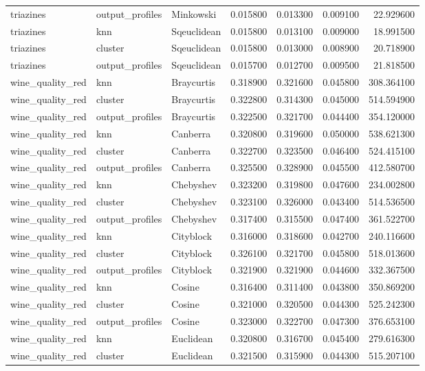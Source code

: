 \begin{tabular}{lllrrrr}
triazines & output\_profiles & Minkowski & 0.015800 & 0.013300 & 0.009100 & 22.929600 \\
triazines & knn & Sqeuclidean & 0.015800 & 0.013100 & 0.009000 & 18.991500 \\
triazines & cluster & Sqeuclidean & 0.015800 & 0.013000 & 0.008900 & 20.718900 \\
triazines & output\_profiles & Sqeuclidean & 0.015700 & 0.012700 & 0.009500 & 21.818500 \\
wine\_quality\_red & knn & Braycurtis & 0.318900 & 0.321600 & 0.045800 & 308.364100 \\
wine\_quality\_red & cluster & Braycurtis & 0.322800 & 0.314300 & 0.045000 & 514.594900 \\
wine\_quality\_red & output\_profiles & Braycurtis & 0.322500 & 0.321700 & 0.044400 & 354.120000 \\
wine\_quality\_red & knn & Canberra & 0.320800 & 0.319600 & 0.050000 & 538.621300 \\
wine\_quality\_red & cluster & Canberra & 0.322700 & 0.323500 & 0.046400 & 524.415100 \\
wine\_quality\_red & output\_profiles & Canberra & 0.325500 & 0.328900 & 0.045500 & 412.580700 \\
wine\_quality\_red & knn & Chebyshev & 0.323200 & 0.319800 & 0.047600 & 234.002800 \\
wine\_quality\_red & cluster & Chebyshev & 0.323100 & 0.326000 & 0.043400 & 514.536500 \\
wine\_quality\_red & output\_profiles & Chebyshev & 0.317400 & 0.315500 & 0.047400 & 361.522700 \\
wine\_quality\_red & knn & Cityblock & 0.316000 & 0.318600 & 0.042700 & 240.116600 \\
wine\_quality\_red & cluster & Cityblock & 0.326100 & 0.321700 & 0.045800 & 518.013600 \\
wine\_quality\_red & output\_profiles & Cityblock & 0.321900 & 0.321900 & 0.044600 & 332.367500 \\
wine\_quality\_red & knn & Cosine & 0.316400 & 0.311400 & 0.043800 & 350.869200 \\
wine\_quality\_red & cluster & Cosine & 0.321000 & 0.320500 & 0.044300 & 525.242300 \\
wine\_quality\_red & output\_profiles & Cosine & 0.323000 & 0.322700 & 0.047300 & 376.653100 \\
wine\_quality\_red & knn & Euclidean & 0.320800 & 0.316700 & 0.045400 & 279.616300 \\
wine\_quality\_red & cluster & Euclidean & 0.321500 & 0.315900 & 0.044300 & 515.207100 \\

\end{tabular}
